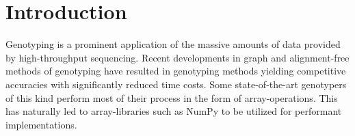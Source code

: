 \section*{Introduction}

Genotyping is a prominent application of the massive amounts of data provided by high-throughput sequencing. 
Recent developments in graph and alignment-free methods of genotyping have resulted in genotyping methods yielding competitive accuracies with significantly reduced time costs.
Some state-of-the-art genotypers of this kind perform most of their process in the form of array-operations. This has naturally led to array-libraries such as NumPy to be utilized for performant implementations.
